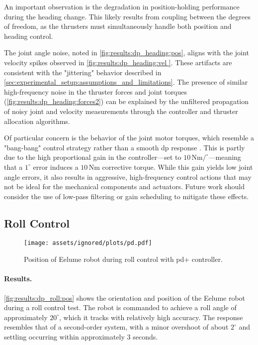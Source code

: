 An important observation is the degradation in position-holding performance 
during the heading change. This likely results from coupling between the 
degrees of freedom, as the thrusters must simultaneously handle both position 
and heading control.

The joint angle noise, noted in \autoref{fig:results:dp_heading:pos}, aligns 
with the joint velocity spikes observed in \autoref{fig:results:dp_heading:vel
}. These artifacts are consistent with the "jittering" behavior described in
\autoref{sec:experimental_setup:assumptions_and_limitations}. The presence of 
similar high-frequency noise in the thruster forces and joint torques
(\autoref{fig:results:dp_heading:forces2}) can be explained by the unfiltered 
propagation of noisy joint and velocity measurements through the controller 
and thruster allocation algorithms.

Of particular concern is the behavior of the joint motor torques, which 
resemble a "bang-bang" control strategy rather than a smooth \gls{dp} response
. This is partly due to the high proportional gain in the controller—set to
\(10\,\mathrm{Nm}/^\circ\)—meaning that a \(1^\circ\) error induces a 
\(10\,\mathrm{Nm}\) corrective torque. While this gain yields low joint angle 
errors, it also results in aggressive, high-frequency control actions that may 
not be ideal for the mechanical components and actuators. Future work should 
consider the use of low-pass filtering or gain scheduling to mitigate these effects.

\FloatBarrier

\subsection{Roll Control}

\begin{figure}[!ht]
    \centering
    \texttt{[image: assets/ignored/plots/pd.pdf]}
    \caption{Position of Eelume robot during roll control with \gls{pd+} controller.}
    \label{fig:results:dp_roll:pos}
\end{figure}

\paragraph{Results.}

\autoref{fig:results:dp_roll:pos} shows the orientation and position of the 
Eelume robot during a roll control test. The robot is commanded to achieve a 
roll angle of approximately \(20^\circ\), which it tracks with relatively high 
accuracy. The response resembles that of a second-order system, with a minor 
overshoot of about \(2^\circ\) and settling occurring within approximately
\(3\) seconds.

